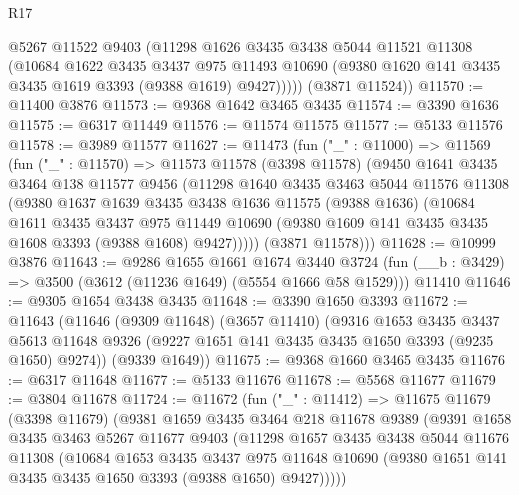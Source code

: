\begin{lexlean}{R17}
\begin{coremodule}
          @5267
          @11522
          @9403
          (@11298
            @1626
            @3435
            @3438
            @5044
            @11521
            @11308
            (@10684
              @1622
              @3435
              @3437
              @975
              @11493
              @10690
              (@9380 @1620 @141 @3435 @3435 @1619 @3393 (@9388 @1619) @9427)))))
      (@3871 @11524))
@11570 := @11400 @3876
@11573 := @9368 @1642 @3465 @3435
@11574 := @3390 @1636
@11575 := @6317 @11449
@11576 := @11574 @11575
@11577 := @5133 @11576
@11578 := @3989 @11577
@11627 := @11473
    (fun ("_" : @11000) =>
    @11569
      (fun ("_" : @11570) =>
      @11573
        @11578
        (@3398 @11578)
        (@9450
          @1641
          @3435
          @3464
          @138
          @11577
          @9456
          (@11298
            @1640
            @3435
            @3463
            @5044
            @11576
            @11308
            (@9380
              @1637
              @1639
              @3435
              @3438
              @1636
              @11575
              (@9388 @1636)
              (@10684
                @1611
                @3435
                @3437
                @975
                @11449
                @10690
                (@9380 @1609 @141 @3435 @3435 @1608 @3393 (@9388 @1608) @9427)))))
        (@3871 @11578)))
@11628 := @10999 @3876
@11643 := @9286
    @1655
    @1661
    @1674
    @3440
    @3724
    (fun (__b : @3429) => @3500 (@3612 (@11236 @1649) (@5554 @1666 @58 @1529)))
    @11410
@11646 := @9305 @1654 @3438 @3435
@11648 := @3390 @1650 @3393
@11672 := @11643
    (@11646
      (@9309 @11648)
      (@3657 @11410)
      (@9316
        @1653
        @3435
        @3437
        @5613
        @11648
        @9326
        (@9227 @1651 @141 @3435 @3435 @1650 @3393 (@9235 @1650) @9274))
      (@9339 @1649))
@11675 := @9368 @1660 @3465 @3435
@11676 := @6317 @11648
@11677 := @5133 @11676
@11678 := @5568 @11677
@11679 := @3804 @11678
@11724 := @11672
    (fun ("_" : @11412) =>
    @11675
      @11679
      (@3398 @11679)
      (@9381
        @1659
        @3435
        @3464
        @218
        @11678
        @9389
        (@9391
          @1658
          @3435
          @3463
          @5267
          @11677
          @9403
          (@11298
            @1657
            @3435
            @3438
            @5044
            @11676
            @11308
            (@10684
              @1653
              @3435
              @3437
              @975
              @11648
              @10690
              (@9380 @1651 @141 @3435 @3435 @1650 @3393 (@9388 @1650) @9427)))))

\end{coremodule}
\end{lexlean}
